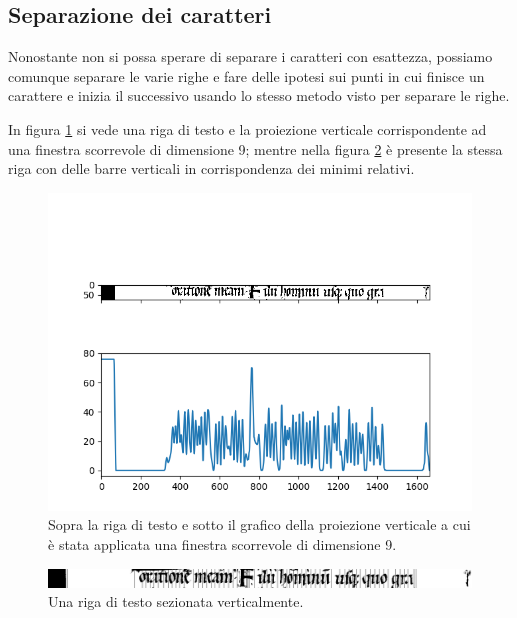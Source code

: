 \subsection{Separazione dei caratteri}

Nonostante non si possa sperare di separare i caratteri con esattezza, possiamo comunque separare le varie righe e fare delle ipotesi sui punti in cui finisce un carattere e inizia il successivo usando lo stesso metodo visto per separare le righe.

In figura \ref{fig:vert_proj_smooth} si vede una riga di testo e la proiezione verticale corrispondente ad una finestra scorrevole di dimensione 9; mentre nella figura \ref{fig:sectioned_row} \`e presente la stessa riga con delle barre verticali in corrispondenza dei minimi relativi.

\begin{figure}
    \includegraphics[width=\textwidth]{figures/vertical-projection-smooth.png}
    \caption{Sopra la riga di testo e sotto il grafico della proiezione verticale a cui \`e stata applicata una finestra scorrevole di dimensione 9.}
    \label{fig:vert_proj_smooth}
\end{figure}

\begin{figure}
    \includegraphics[width=\textwidth]{figures/Bodmer 30_012v_large.jpg_sectioned_row_10.jpg}
    \caption{Una riga di testo sezionata verticalmente.}
    \label{fig:sectioned_row}
\end{figure}

